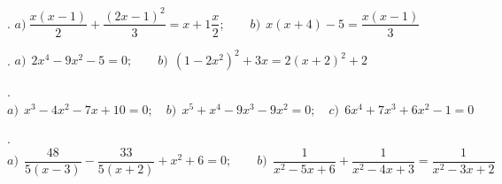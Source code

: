 \begin{mipropuesto}
. $a)\ \dfrac{x(x-1)}{2}+\dfrac{(2x-1)^2}{3}=x+1\dfrac x 2; \qquad b) \ \ x(x+4)-5=\dfrac{x(x-1)}{3}$
\end{mipropuesto}
\vspace{-8mm}
\begin{flushright}
	\begin{footnotesize} \textcolor{gris}{}	\end{footnotesize}
\end{flushright}

\begin{mipropuesto}
. $a)\ \ 2x^4-9x^2-5=0;\qquad b)\ \ 	(1-2x^2)^2+3x=2(x+2)^2+2$
\end{mipropuesto}
\vspace{-8mm}
\begin{flushright}
	\begin{footnotesize} \textcolor{gris}{}	\end{footnotesize}
\end{flushright}

\begin{mipropuesto}
. $a)\ \ x^3-4x^2-7x+10=0;\quad b)\ \ x^5+x^4-9x^3-9x^2=0;\quad c)\ \ 6x^4+7x^3+6x^2-1=0$	
\end{mipropuesto}
\vspace{-8mm}
\begin{flushright}
	\begin{footnotesize} \textcolor{gris}{}	\end{footnotesize}
\end{flushright}

\begin{mipropuesto}
. $a)\ \ \dfrac{48}{5(x-3)}-\dfrac{33}{5(x+2)}+x^2+6=0;\qquad b)\ \ \dfrac{1}{x^2-5x+6}+\dfrac{1}{x^2-4x+3}=\dfrac{1}{x^2-3x+2}$	
\end{mipropuesto}
\vspace{-8mm}
\begin{flushright}
	\begin{footnotesize} \textcolor{gris}{}	\end{footnotesize}
\end{flushright}


